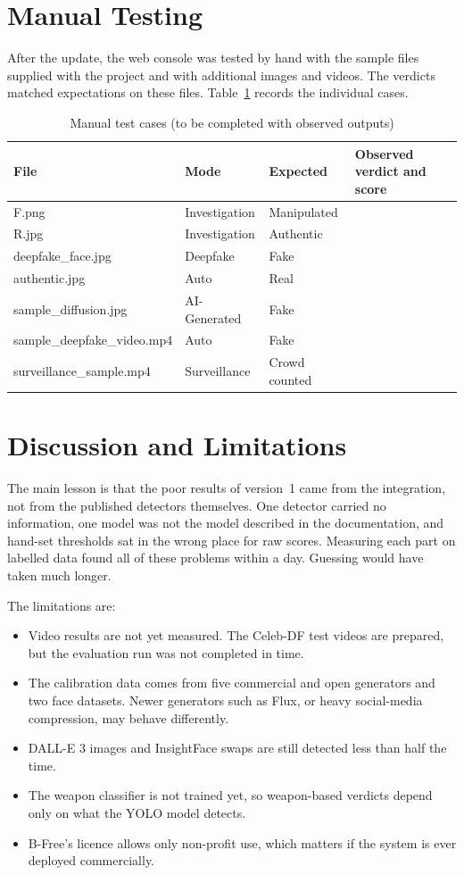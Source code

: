 \documentclass[12pt,a4paper,oneside]{report}
\begin{document}
\section{Manual Testing}
After the update, the web console was tested by hand with the sample files supplied with the project and with additional images and videos. The verdicts matched expectations on these files. Table~\ref{tab:manual} records the individual cases.

\begin{table}[H]
\centering
\caption{Manual test cases (to be completed with observed outputs)}\label{tab:manual}
\begin{tabularx}{\textwidth}{@{}lllX@{}}
\toprule
File & Mode & Expected & Observed verdict and score \\
\midrule
F.png & Investigation & Manipulated & \\
R.jpg & Investigation & Authentic & \\
deepfake\_face.jpg & Deepfake & Fake & \\
authentic.jpg & Auto & Real & \\
sample\_diffusion.jpg & AI-Generated & Fake & \\
sample\_deepfake\_video.mp4 & Auto & Fake & \\
surveillance\_sample.mp4 & Surveillance & Crowd counted & \\
\bottomrule
\end{tabularx}
\end{table}

\section{Discussion and Limitations}
The main lesson is that the poor results of version~1 came from the integration, not from the published detectors themselves. One detector carried no information, one model was not the model described in the documentation, and hand-set thresholds sat in the wrong place for raw scores. Measuring each part on labelled data found all of these problems within a day. Guessing would have taken much longer.

The limitations are:
\begin{itemize}
  \item Video results are not yet measured. The Celeb-DF test videos are prepared, but the evaluation run was not completed in time.
  \item The calibration data comes from five commercial and open generators and two face datasets. Newer generators such as Flux, or heavy social-media compression, may behave differently.
  \item DALL-E 3 images and InsightFace swaps are still detected less than half the time.
  \item The weapon classifier is not trained yet, so weapon-based verdicts depend only on what the YOLO model detects.
  \item B-Free's licence allows only non-profit use, which matters if the system is ever deployed commercially.
\end{itemize}
\end{document}
